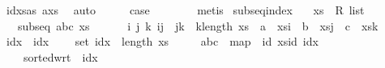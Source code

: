 \begin{isabellebody}
\ idxsa{\isacharunderscore}{\kern0pt}s\ a{\isacharunderscore}{\kern0pt}xs{\isacharparenleft}{\kern0pt}{}{\isacharparenright}{\kern0pt}\ \isamarkupfalse%
\ auto\isanewline
\ \ \isamarkupfalse%
\ \isamarkupfalse%
\ {\isacharquery}{\kern0pt}case\ \isamarkupfalse%
\ {}\ {}\ {}\ {}\ \isamarkupfalse%
\ metis\isanewline
{}\isamarkupfalse%
%
\endisatagproof
{\isafoldproof}%
%
\isadelimproof
\isanewline
%
\endisadelimproof
\isanewline
{}\isamarkupfalse%
\ subseq{\isacharunderscore}{\kern0pt}index{}{\isacharcolon}{\kern0pt}\isanewline
\ \ \ xs\ {\isacharcolon}{\kern0pt}{\isacharcolon}{\kern0pt}\ {\isachardoublequoteopen}R{}\ list{\isachardoublequoteclose}\isanewline
\ \ \ {\isachardoublequoteopen}subseq\ {\isacharbrackleft}{\kern0pt}a{\isacharcomma}{\kern0pt}b{\isacharcomma}{\kern0pt}c{\isacharbrackright}{\kern0pt}\ xs{\isachardoublequoteclose}\isanewline
\ \ \ \ \ {\isachardoublequoteopen}{\isasymexists}\ i\ j\ k{\isachardot}{\kern0pt}\ i{\isacharless}{\kern0pt}j\ {\isasymand}\ j{\isacharless}{\kern0pt}k\ {\isasymand}\ k{\isacharless}{\kern0pt}length\ xs\ {\isasymand}\ a\ {\isacharequal}{\kern0pt}\ xs{\isacharbang}{\kern0pt}i\ {\isasymand}\ b\ {\isacharequal}{\kern0pt}\ xs{\isacharbang}{\kern0pt}j\ {\isasymand}\ c\ {\isacharequal}{\kern0pt}\ xs{\isacharbang}{\kern0pt}k{\isachardoublequoteclose}\isanewline
%
\isadelimproof
%
\endisadelimproof
%
\isatagproof
{}\isamarkupfalse%
{\isacharminus}{\kern0pt}\isanewline
\ \ \isamarkupfalse%
\ idx\ \ idx{\isacharcolon}{\kern0pt}\isanewline
\ \ \ \ {\isachardoublequoteopen}set\ idx\ {\isasymsubseteq}\ {\isacharbraceleft}{\kern0pt}{\isachardot}{\kern0pt}{\isachardot}{\kern0pt}{\isacharless}{\kern0pt}length\ xs{\isacharbraceright}{\kern0pt}{\isachardoublequoteclose}\ \isanewline
\ \ \ \ {\isachardoublequoteopen}{\isacharbrackleft}{\kern0pt}a{\isacharcomma}{\kern0pt}b{\isacharcomma}{\kern0pt}c{\isacharbrackright}{\kern0pt}\ {\isacharequal}{\kern0pt}\ map\ {\isacharparenleft}{\kern0pt}{\isasymlambda}\ id{\isachardot}{\kern0pt}\ xs{\isacharbang}{\kern0pt}id{\isacharparenright}{\kern0pt}\ idx{\isachardoublequoteclose}\ \isanewline
\ \ \ \ {\isachardoublequoteopen}sorted{\isacharunderscore}{\kern0pt}wrt\ {\isacharparenleft}{\kern0pt}{\isacharless}{\kern0pt}{\isacharparenright}{\kern0pt}\ idx{\isachardoublequoteclose}\ \isanewline

\end{isabellebody}

